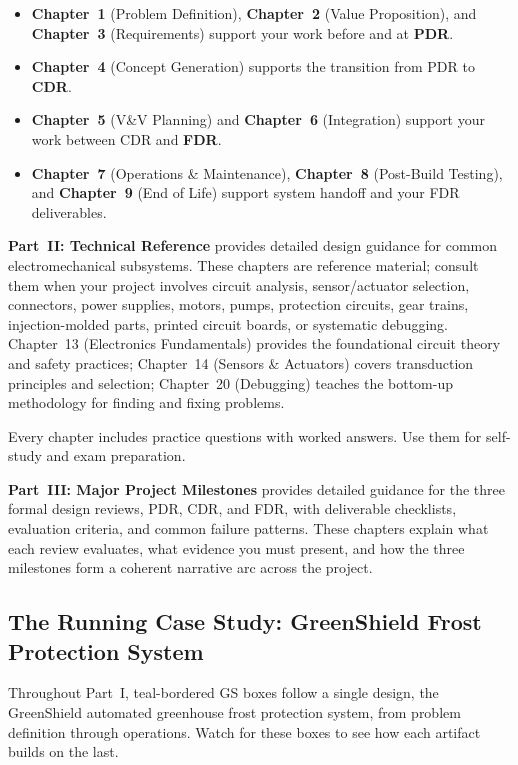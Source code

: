 \documentclass[11pt,letterpaper,twoside,openany]{book}
\begin{document}
\begin{itemize}[nosep,leftmargin=1.5em]
\item \textbf{Chapter~1} (Problem Definition), \textbf{Chapter~2} (Value Proposition), and \textbf{Chapter~3} (Requirements) support your work before and at \textbf{PDR}.
\item \textbf{Chapter~4} (Concept Generation) supports the transition from PDR to \textbf{CDR}.
\item \textbf{Chapter~5} (V\&V Planning) and \textbf{Chapter~6} (Integration) support your work between CDR and \textbf{FDR}.
\item \textbf{Chapter~7} (Operations \& Maintenance), \textbf{Chapter~8} (Post-Build Testing), and \textbf{Chapter~9} (End of Life) support system handoff and your FDR deliverables.
\end{itemize}

\textbf{Part~II: Technical Reference} provides detailed design guidance for common electromechanical subsystems. These chapters are reference material; consult them when your project involves circuit analysis, sensor/actuator selection, connectors, power supplies, motors, pumps, protection circuits, gear trains, injection-molded parts, printed circuit boards, or systematic debugging. Chapter~13 (Electronics Fundamentals) provides the foundational circuit theory and safety practices; Chapter~14 (Sensors \& Actuators) covers transduction principles and selection; Chapter~20 (Debugging) teaches the bottom-up methodology for finding and fixing problems.

Every chapter includes practice questions with worked answers. Use them for self-study and exam preparation.

\textbf{Part~III: Major Project Milestones} provides detailed guidance for the three formal design reviews, PDR, CDR, and FDR, with deliverable checklists, evaluation criteria, and common failure patterns. These chapters explain what each review evaluates, what evidence you must present, and how the three milestones form a coherent narrative arc across the project.

\subsection*{The Running Case Study: GreenShield Frost Protection System}
Throughout Part~I, teal-bordered \textsf{GS} boxes follow a single design, the GreenShield automated greenhouse frost protection system, from problem definition through operations. Watch for these boxes to see how each artifact builds on the last.
\end{document}
